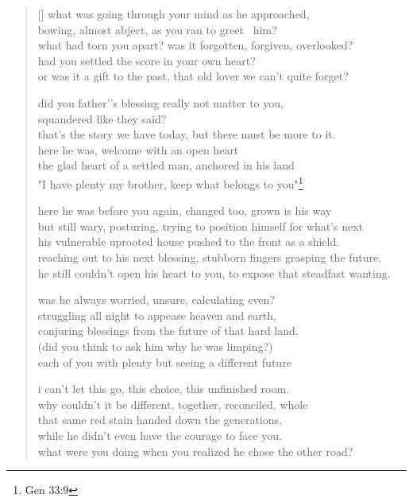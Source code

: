 
\settowidth{}
\begin{verse}[\versewidth]
what was going through your mind as he approached, \\
bowing, almost abject, as you ran to greet  him? \\
what had torn you apart? was it forgotten, forgiven, overlooked? \\
had you settled the score in your own heart? \\
or was it a gift to the past, that old lover we can't quite forget? 

did you father’'s blessing really not matter to you,  \\
squandered like they said? \\
that's the story we have today, but there must be more to it. \\
here he was, welcome with an open heart \\
the glad heart of a settled man, anchored in his land \\
"I have plenty my brother, keep what belongs to you"\footnote{Gen 33:9}

here he was before you again, changed too, grown is his way \\
but still wary, posturing, trying to position himself for what's next \\
his vulnerable uprooted house pushed to the front as a shield. \\
reaching out to his next blessing, stubborn fingers grasping the future. \\
he still couldn't open his heart to you, to expose that steadfast wanting.

was he always worried, unsure, calculating even? \\
struggling all night to appease heaven and earth,  \\
conjuring blessings from the future of that hard land. \\
(did you think to ask him why he was limping?) \\
each of you with plenty but seeing a different future 

i can't let this go, this choice, this unfinished room. \\
why couldn't it be different, together, reconciled, whole \\
that same red stain handed down the generations, \\
while he didn't even have the courage to face you. \\
what were you doing when you realized he chose the other road? 

\end{verse}
